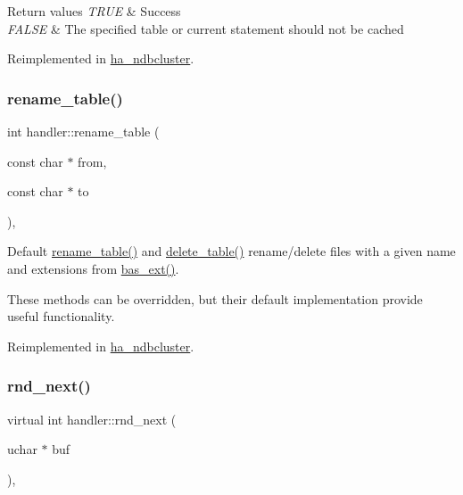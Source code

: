 \begin{DoxyRetVals}{Return values}
{\em T\+R\+UE} & Success \\
\hline
{\em F\+A\+L\+SE} & The specified table or current statement should not be cached \\
\hline
\end{DoxyRetVals}


Reimplemented in \mbox{\hyperlink{classha__ndbcluster_abef3e8ffe1d4b952fc59b356d3d5f142}{ha\+\_\+ndbcluster}}.

\mbox{\label{classhandler_a58bf8fa32d87654794e6b1c3b3fb8d32}} 
\subsubsection{\texorpdfstring{rename\+\_\+table()}{rename\_table()}}
{\footnotesize\ttfamily int handler\+::rename\+\_\+table (\begin{DoxyParamCaption}\item[{const char $\ast$}]{from,  }\item[{const char $\ast$}]{to }\end{DoxyParamCaption})\hspace{0.3cm}{\ttfamily [protected]}, {\ttfamily [virtual]}}

Default \mbox{\hyperlink{classhandler_a58bf8fa32d87654794e6b1c3b3fb8d32}{rename\+\_\+table()}} and \mbox{\hyperlink{classhandler_ae53ec34116b901cc08e5a87f5ec681a6}{delete\+\_\+table()}} rename/delete files with a given name and extensions from \mbox{\hyperlink{classhandler_a748d5e5b6dbbb0681cbac2ad881505c9}{bas\+\_\+ext()}}.

These methods can be overridden, but their default implementation provide useful functionality. 

Reimplemented in \mbox{\hyperlink{classha__ndbcluster_a5609bf8b91966dacc3610fc7ceffc314}{ha\+\_\+ndbcluster}}.

\mbox{\label{classhandler_a48cb9c94ca93dbfbb7e92822caba82a1}} 
\subsubsection{\texorpdfstring{rnd\+\_\+next()}{rnd\_next()}}
{\footnotesize\ttfamily virtual int handler\+::rnd\+\_\+next (\begin{DoxyParamCaption}\item[{uchar $\ast$}]{buf }\end{DoxyParamCaption})\hspace{0.3cm}{\ttfamily [protected]}, {}}

